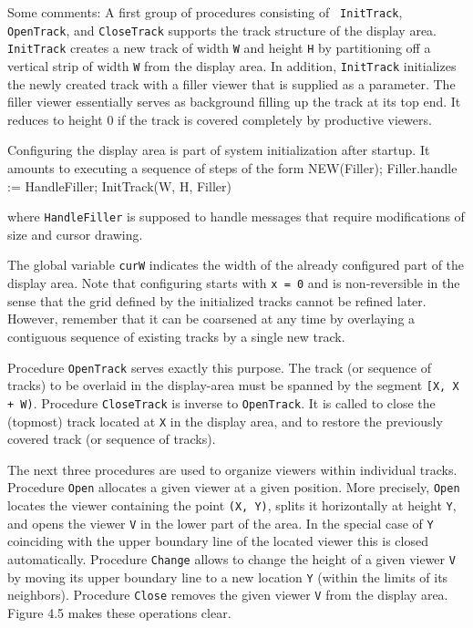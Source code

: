\noindent Some comments: A first group of procedures consisting of {\tt
InitTrack\/}, {\tt OpenTrack\/}, and {\tt CloseTrack\/} supports the
track structure of the display area. {\tt InitTrack\/} creates a new track of
width {\tt W\/} and height {\tt H\/} by partitioning off a vertical strip of width {\tt W\/}
from the display area. In addition, {\tt InitTrack\/} initializes the newly
created track with a filler viewer that is supplied as a
parameter. The filler viewer essentially serves as background filling
up the track at its top end. It reduces to height 0 if the track is
covered completely by productive viewers.

Configuring the display area is part of system initialization after
startup. It amounts to executing a sequence of steps of the form
\begintt
NEW(Filler); Filler.handle := HandleFiller; InitTrack(W, H, Filler)
\endtt

\noindent where {\tt HandleFiller\/} is supposed to handle messages
that require modifications of size and cursor drawing.

The global variable {\tt curW\/} indicates the width of the already configured
part of the display area. Note that configuring starts with {\tt x = 0\/} and
is non-reversible in the sense that the grid defined by the
initialized tracks cannot be refined later. However, remember that it
can be coarsened at any time by overlaying a contiguous sequence of
existing tracks by a single new track.

Procedure {\tt OpenTrack\/} serves exactly this purpose. The track (or
sequence of tracks) to be overlaid in the display-area must be spanned
by the segment {\tt [X, X + W)\/}. Procedure {\tt CloseTrack\/} is inverse to
{\tt OpenTrack\/}. It is called to close the (topmost) track located at {\tt X\/} in
the display area, and to restore the previously covered track (or
sequence of tracks).

The next three procedures are used to organize viewers within
individual tracks. Procedure {\tt Open\/} allocates a given viewer at a given
position. More precisely, {\tt Open\/} locates the viewer containing the point
{\tt (X, Y)\/}, splits it horizontally at height {\tt Y\/}, and opens the viewer {\tt V\/} in
the lower part of the area. In the special case of {\tt Y\/} coinciding with
the upper boundary line of the located viewer this is closed
automatically. Procedure {\tt Change\/} allows to change the height of a given
viewer {\tt V\/} by moving its upper boundary line to a new location {\tt Y\/} (within
the limits of its neighbors). Procedure {\tt Close\/} removes the given viewer
{\tt V\/} from the display area. Figure 4.5 makes these operations clear.

